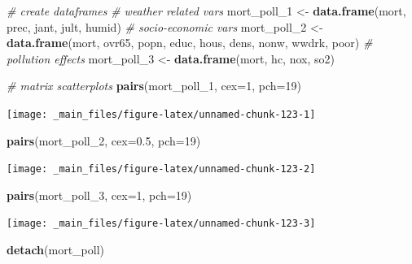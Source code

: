 \documentclass[
]{book}
\newenvironment{Shaded}{\begin{snugshade}}{\end{snugshade}}
\newcommand{\CommentTok}[1]{\textcolor[rgb]{0.56,0.35,0.01}{\textit{#1}}}
\newcommand{\DataTypeTok}[1]{\textcolor[rgb]{0.13,0.29,0.53}{#1}}
\newcommand{\DecValTok}[1]{\textcolor[rgb]{0.00,0.00,0.81}{#1}}
\newcommand{\FloatTok}[1]{\textcolor[rgb]{0.00,0.00,0.81}{#1}}
\newcommand{\KeywordTok}[1]{\textcolor[rgb]{0.13,0.29,0.53}{\textbf{#1}}}
\newcommand{\NormalTok}[1]{#1}
\newcommand{\StringTok}[1]{\textcolor[rgb]{0.31,0.60,0.02}{#1}}
\begin{document}
\begin{Shaded}
\begin{Highlighting}[]
\CommentTok{# create dataframes}
\CommentTok{# weather related vars}
\NormalTok{mort_poll_}\DecValTok{1}\NormalTok{ <-}\StringTok{ }\KeywordTok{data.frame}\NormalTok{(mort, prec, jant, jult, humid)}
\CommentTok{# socio-economic vars}
\NormalTok{mort_poll_}\DecValTok{2}\NormalTok{ <-}\StringTok{ }\KeywordTok{data.frame}\NormalTok{(mort, ovr65, popn, educ, hous, dens, nonw, wwdrk, poor)}
\CommentTok{# pollution effects}
\NormalTok{mort_poll_}\DecValTok{3}\NormalTok{ <-}\StringTok{ }\KeywordTok{data.frame}\NormalTok{(mort, hc, nox, so2)}

\CommentTok{# matrix scatterplots}
\KeywordTok{pairs}\NormalTok{(mort_poll_}\DecValTok{1}\NormalTok{, }\DataTypeTok{cex=}\DecValTok{1}\NormalTok{, }\DataTypeTok{pch=}\DecValTok{19}\NormalTok{)}
\end{Highlighting}
\end{Shaded}

\begin{center}\texttt{[image: \_main\_files/figure-latex/unnamed-chunk-123-1]} \end{center}

\begin{Shaded}
\begin{Highlighting}[]
\KeywordTok{pairs}\NormalTok{(mort_poll_}\DecValTok{2}\NormalTok{, }\DataTypeTok{cex=}\FloatTok{0.5}\NormalTok{, }\DataTypeTok{pch=}\DecValTok{19}\NormalTok{)}
\end{Highlighting}
\end{Shaded}

\begin{center}\texttt{[image: \_main\_files/figure-latex/unnamed-chunk-123-2]} \end{center}

\begin{Shaded}
\begin{Highlighting}[]
\KeywordTok{pairs}\NormalTok{(mort_poll_}\DecValTok{3}\NormalTok{, }\DataTypeTok{cex=}\DecValTok{1}\NormalTok{, }\DataTypeTok{pch=}\DecValTok{19}\NormalTok{)}
\end{Highlighting}
\end{Shaded}

\begin{center}\texttt{[image: \_main\_files/figure-latex/unnamed-chunk-123-3]} \end{center}

\begin{Shaded}
\begin{Highlighting}[]
\KeywordTok{detach}\NormalTok{(mort_poll)}
\end{Highlighting}
\end{Shaded}
\end{document}
